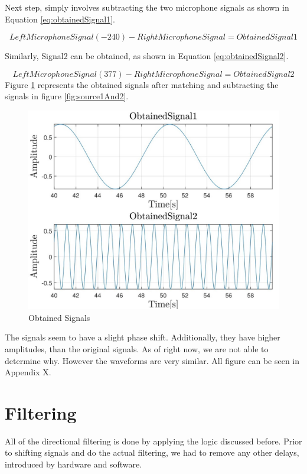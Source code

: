 Next step, simply involves subtracting the two microphone signals as shown in Equation \ref{eq:obtainedSignal1}.

\begin{equation}
	LeftMicrophoneSignal(-240) - RightMicrophoneSignal = ObtainedSignal1
	\label{eq:obtainedSignal1}
\end{equation}

Similarly, Signal2 can be obtained, as shown in Equation \ref{eq:obtainedSignal2}.

\begin{equation}
	LeftMicrophoneSignal(377) - RightMicrophoneSignal = ObtainedSignal2
	\label{eq:obtainedSignal2}
\end{equation}
\newpage
Figure \ref{fig:obtainedSignals} represents the obtained signals after matching and subtracting the 
signals in figure \ref{fig:source1And2}.

\begin{figure}[htp]
	\centering
	\includegraphics[width=\textwidth]{Illustrations/obtainedSource1And2.jpg}
	\caption{Obtained Signals}
	\label{fig:obtainedSignals}
\end{figure}

The signals seem to have a slight phase shift. Additionally, they have higher amplitudes, than the original
signals. As of right now, we are not able to determine why. However the waveforms are very similar.
All figure can be seen in Appendix X.
\newpage
\section{Filtering}
All of the directional filtering is done by applying the logic discussed before. Prior to shifting signals 
and do the actual filtering, we had to remove any other delays, introduced by hardware and software.

